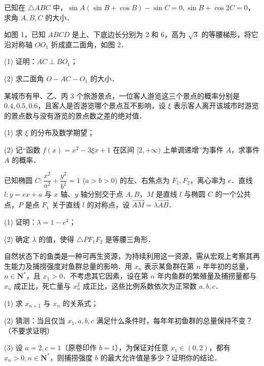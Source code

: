 \begin{question}
已知在 $\triangle ABC$ 中，$\sin A(\sin B + \cos B) - \sin C = 0, \sin B + \cos 2C = 0$，求角 $A, B, C$ 的大小．

\Needspace{0.4\textheight}
\end{question}
\begin{question}
如图 1，已知 $ABCD$ 是上、下底边长分别为 2 和 6，高为 $\sqrt{3}$ 的等腰梯形，将它沿对称轴 $OO_1$ 折成直二面角，如图 2．
\nopagebreak[4]
\begin{center}\end{center}
\nopagebreak[4]
(1) 证明：$AC \perp BO_1$；

(2) 求二面角 $O - AC - O_1$ 的大小．

\end{question}
\begin{question}
某城市有甲、乙、丙 3 个旅游景点，一位客人游览这三个景点的概率分别是 $0.4, 0.5, 0.6$，且客人是否游览哪个景点互不影响，设 $\xi$ 表示客人离开该城市时游览的景点数与没有游览的景点数之差的绝对值．

(1) 求 $\xi$ 的分布及数学期望；

(2) 记“函数 $f(x) = x^2 - 3\xi x + 1$ 在区间 $[2, +\infty)$ 上单调递增”为事件 $A$，求事件 $A$ 的概率．

\end{question}
\begin{question}
已知椭圆 $C: \dfrac{x^2}{a^2} + \dfrac{y^2}{b^2} = 1$ ($a > b > 0$) 的左、右焦点为 $F_1, F_2$，离心率为 $e$．直线 $l: y = ex + a$ 与 $x$ 轴、$y$ 轴分别交于点 $A, B$，$M$ 是直线 $l$ 与椭圆 $C$ 的一个公共点，$P$ 是点 $F_1$ 关于直线 $l$ 的对称点，设 $\vec{AM} = \lambda\vec{AB}$．

(1) 证明：$\lambda = 1 - e^2$；

(2) 确定 $\lambda$ 的值，使得 $\triangle PF_1F_2$ 是等腰三角形．

\end{question}
\begin{question}
自然状态下的鱼类是一种可再生资源，为持续利用这一资源，需从宏观上考察其再生能力及捕捞强度对鱼群总量的影响．用 $x_n$ 表示某鱼群在第 $n$ 年年初的总量，$n \in \mathbf{N}^*$，且 $x_1 > 0$．不考虑其它因素，设在第 $n$ 年内鱼群的繁殖量及捕捞量都与 $x_n$ 成正比，死亡量与 $x_n^2$ 成正比，这些比例系数依次为正常数 $a, b, c$．

(1) 求 $x_{n+1}$ 与 $x_n$ 的关系式；

(2) 猜测：当且仅当 $x_1, a, b, c$ 满足什么条件时，每年年初鱼群的总量保持不变？（不要求证明）

(3) 设 $a = 2, c = 1$（原卷印作 $b = 1$），为保证对任意 $x_1 \in (0, 2)$，都有 $x_n > 0, n \in \mathbf{N}^*$，则捕捞强度 $b$ 的最大允许值是多少？证明你的结论．

\end{question}
